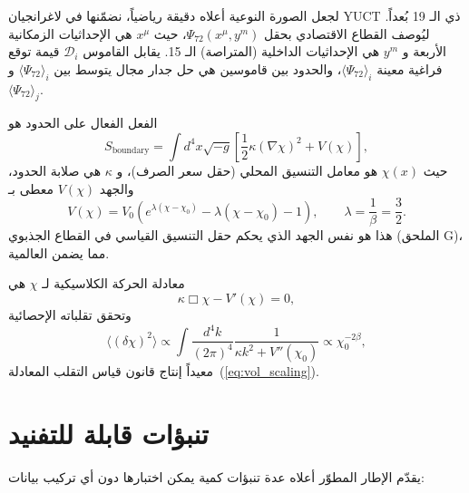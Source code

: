 \documentclass[12pt,a4paper]{article}
\theoremstyle{remark}
\begin{document}
	لجعل الصورة النوعية أعلاه دقيقة رياضياً، نضمّنها في لاغرانجيان YUCT ذي الـ 19 بُعداً. ليُوصف القطاع الاقتصادي بحقل \(\Psi_{72}(x^\mu, y^m)\)، حيث \(x^\mu\) هي الإحداثيات الزمكانية الأربعة و \(y^m\) هي الإحداثيات الداخلية (المتراصة) الـ 15. يقابل القاموس \(\mathcal{D}_i\) قيمة توقع فراغية معينة \(\langle \Psi_{72} \rangle_i\)، والحدود بين قاموسين هي حل جدار مجال يتوسط بين \(\langle \Psi_{72} \rangle_i\) و \(\langle \Psi_{72} \rangle_j\).
	
	الفعل الفعال على الحدود هو
	\begin{equation}
		S_{\mathrm{boundary}} = \int d^4x \sqrt{-g} \left[ \frac{1}{2} \kappa (\nabla \chi)^2 + V(\chi) \right],
		\label{eq:action}
	\end{equation}
	حيث \(\chi(x)\) هو معامل التنسيق المحلي (حقل سعر الصرف)، و \(\kappa\) هي صلابة الحدود، والجهد \(V(\chi)\) معطى بـ
	\begin{equation}
		V(\chi) = V_0 \left( e^{\lambda(\chi - \chi_0)} - \lambda(\chi - \chi_0) - 1 \right), \qquad \lambda = \frac{1}{\beta} = \frac{3}{2}.
		\label{eq:potential}
	\end{equation}
	هذا هو نفس الجهد الذي يحكم حقل التنسيق القياسي في القطاع الجذبوي (الملحق G)، مما يضمن العالمية.
	
	معادلة الحركة الكلاسيكية لـ \(\chi\) هي
	\begin{equation}
		\kappa \Box \chi - V'(\chi) = 0,
		\label{eq:eom}
	\end{equation}
	وتحقق تقلباته الإحصائية
	\begin{equation}
		\langle (\delta \chi)^2 \rangle \propto \int \frac{d^4k}{(2\pi)^4} \frac{1}{\kappa k^2 + V''(\chi_0)} \propto \chi_0^{-2\beta},
		\label{eq:fluctuations}
	\end{equation}
	معيداً إنتاج قانون قياس التقلب المعادلة~(\ref{eq:vol_scaling}).
	
	\section{تنبؤات قابلة للتفنيد}
	
	يقدّم الإطار المطوّر أعلاه عدة تنبؤات كمية يمكن اختبارها دون أي تركيب بيانات:
	
\end{document}
